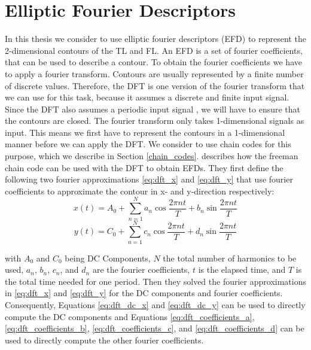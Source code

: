 \documentclass[thesis.tex]{subfiles}
\begin{document}
\section{Elliptic Fourier Descriptors} \label{elliptic_fourier_descriptors}
In this thesis we consider to use elliptic fourier descriptors (EFD) \cite{giardinia} to represent the 2-dimensional contours of the TL and FL. An EFD is a set of fourier coefficients, that can be used to describe a contour. To obtain the fourier coefficients we have to apply a fourier transform. Contours are usually represented by a finite number of discrete values. Therefore, the DFT is one version of the fourier transform that we can use for this task, because it assumes a discrete and finite input signal. Since the DFT also assumes a periodic input signal \cite{dspguide}, we will have to ensure that the contours are closed. The fourier transform only takes 1-dimensional signals as input. This means we first have to represent the contours in a 1-dimensional manner before we can apply the DFT. We consider to use chain codes for this purpose, which we describe in Section \ref{chain_codes}. \cite{giardinia} describes how the freeman chain code can be used with the DFT to obtain EFDs. They first define the following two fourier approximations \ref{eq:dft_x} and \ref{eq:dft_y} that use fourier coefficients to approximate the contour in x- and y-direction respectively:
\begin{equation} \label{eq:dft_x}
 x(t) = A_0 + \sum_{n=1}^{N} a_n \cos \frac{2\pi n t}{T} + b_n \sin \frac{2\pi n t}{T}
\end{equation}
\begin{equation} \label{eq:dft_y}
 y(t) = C_0 + \sum_{n=1}^{N} c_n \cos \frac{2\pi n t}{T} + d_n \sin \frac{2\pi n t}{T}
\end{equation}

with $ A_0$ and $C_0 $ being DC Components, $N$ the total number of harmonics to be used, $a_n$, $b_n$, $c_n$, and $d_n$ are the fourier coefficients, $t$ is the elapsed time, and $T$ is the total time needed for one period.
Then they solved the fourier approximations in \ref{eq:dft_x} and \ref{eq:dft_y} for the DC components and fourier coefficients. Consequently, Equations \ref{eq:dft_dc_x} and \ref{eq:dft_dc_y} can be used to directly compute the DC components and Equations \ref{eq:dft_coefficients_a}, \ref{eq:dft_coefficients_b}, \ref{eq:dft_coefficients_c}, and \ref{eq:dft_coefficients_d} can be used to directly compute the other fourier coefficients. 
\end{document}
